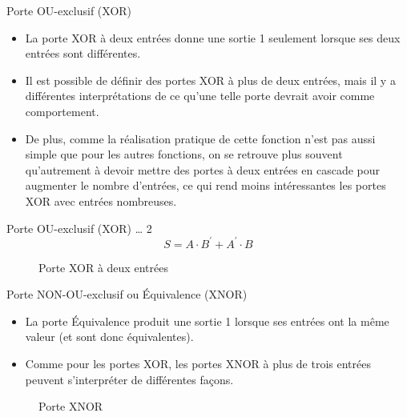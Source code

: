 \documentclass[presentation]{beamer}
\begin{document}
\begin{frame}[label={sec:org23713b6}]{Porte OU-exclusif (XOR)}
\begin{itemize}
\item La porte XOR à deux entrées donne une sortie 1 seulement lorsque ses deux entrées sont différentes.

\item Il est possible de définir des portes XOR à plus de deux entrées, mais il y a différentes interprétations de ce qu'une telle porte devrait avoir comme comportement.

\item De plus, comme la réalisation pratique de cette fonction n'est pas aussi simple que pour les autres fonctions, on se retrouve plus souvent qu'autrement à devoir mettre des portes à deux entrées en cascade pour augmenter le nombre d'entrées, ce qui rend moins intéressantes les portes XOR avec entrées nombreuses.
\end{itemize}
\end{frame}

\begin{frame}[label={sec:orge2c6c07}]{Porte OU-exclusif (XOR) \ldots{} 2}
$$ S= A \cdot B^\prime + A^\prime \cdot B $$  

\begin{figure}[htbp]
\centering

\caption{\label{fig:org5d8ae77}Porte XOR à deux entrées}
\end{figure}
\end{frame}

\begin{frame}[label={sec:org372f8f8}]{Porte NON-OU-exclusif ou Équivalence (XNOR)}
\begin{itemize}
\item La porte \alert{Équivalence} produit une sortie 1 lorsque ses entrées ont la même valeur (et sont donc équivalentes).

\item Comme pour les portes XOR, les portes XNOR à plus de trois entrées peuvent s'interpréter de différentes façons.
\end{itemize}

\begin{figure}[htbp]
\centering

\caption{\label{fig:org9429fd5}Porte XNOR}
\end{figure}
\end{frame}
\end{document}
